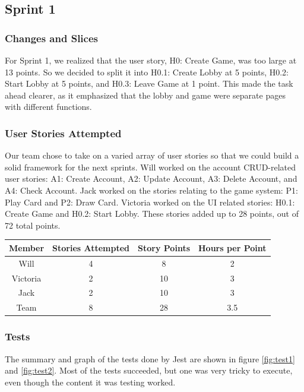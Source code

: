\documentclass{article}
\begin{document}
\subsection{Sprint 1}
\subsubsection{Changes and Slices}
For Sprint 1, we realized that the user story, H0: Create Game, was too large at 13 points. So we decided to split it into H0.1: Create Lobby at 5 points, H0.2: Start Lobby at 5 points, and H0.3: Leave Game at 1 point. This made the task ahead clearer, as it emphasized that the lobby and game were separate pages with different functions.

\subsubsection{User Stories Attempted}
Our team chose to take on a varied array of user stories so that we could build a solid framework for the next sprints. Will worked on the account CRUD-related user stories: A1: Create Account, A2: Update Account, A3: Delete Account, and A4: Check Account. Jack worked on the stories relating to the game system: P1: Play Card and P2: Draw Card. Victoria worked on the UI related stories: H0.1: Create Game and H0.2: Start Lobby. These stories added up to 28 points, out of 72 total points.

\begin{table}[h]
\centering
\begin{tabular}{|c|c|c|c|}
\hline
\textbf{Member} & \textbf{Stories Attempted} & \textbf{Story Points} & \textbf{Hours per Point} \\ \hline
Will     & 4 & 8  & 2 \\ \hline
Victoria & 2 & 10 & 3 \\ \hline
Jack     & 2 & 10 & 3 \\ \hline
Team    & 8 & 28 & 3.5 \\ \hline
\end{tabular}
\end{table}

\subsubsection{Tests}
The summary and graph of the tests done by Jest are shown in figure \ref{fig:test1} and \ref{fig:test2}. Most of the tests succeeded, but one was very tricky to execute, even though the content it was testing worked.
\end{document}
